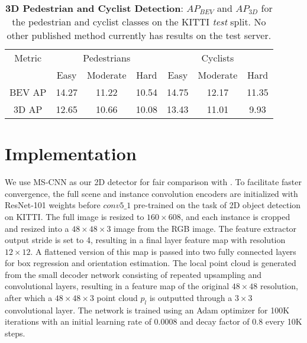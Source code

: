 \documentclass[10pt,twocolumn,letterpaper]{article}
\begin{document}
	\begin{table*}[t!]
		\small
		\centering
		\begin{tabular}{|c||ccc||ccc|}
			\hline
			Metric & \multicolumn{3}{c||}{Pedestrians} & \multicolumn{3}{c|}{Cyclists} \\
			\cline{2-7} & Easy & Moderate & Hard & Easy & Moderate & Hard \\
			\hline
			BEV AP    & 14.27 & 11.22 & 10.54 & 14.75 & 12.17 & 11.35 \\ \hline
			3D AP     & 12.65 & 10.66 & 10.08 & 13.43 & 11.01 &  9.93 \\ \hline
		\end{tabular}
		\caption{\textbf{3D Pedestrian and Cyclist Detection}: \emph{$AP_{BEV}$} and \emph{$AP_{3D}$} for the pedestrian and cyclist classes on the KITTI \emph{test} split. No other published method currently has results on the test server.}
		\label{tab:kitti_test_ped_cyc}
	\end{table*}
	
	\section{Implementation}
	We use MS-CNN \cite{cai} as our 2D detector for fair comparison with \cite{mousavian_deep3dbox}. To facilitate faster convergence, the full scene and instance convolution encoders are initialized with ResNet-101 weights before $\textit{conv}5\_1$ pre-trained on the task of 2D object detection on KITTI. The full image is resized to $160 \times 608$, and each instance is cropped and resized into a $48 \times 48 \times 3$ image from the RGB image. The feature extractor output stride is set to 4, resulting in a final layer feature map with resolution $12 \times 12$. A flattened version of this map is passed into two fully connected layers for box regression and orientation estimation. The local point cloud is generated from the small decoder network consisting of repeated upsampling and convolutional layers, resulting in a feature map of the original $48 \times 48$ resolution, after which a $48 \times 48 \times 3$ point cloud $p_l$ is outputted through a $3 \times 3$ convolutional layer. The network is trained using an Adam optimizer for 100K iterations with an initial learning rate of 0.0008 and decay factor of 0.8 every 10K steps.
	
\end{document}
